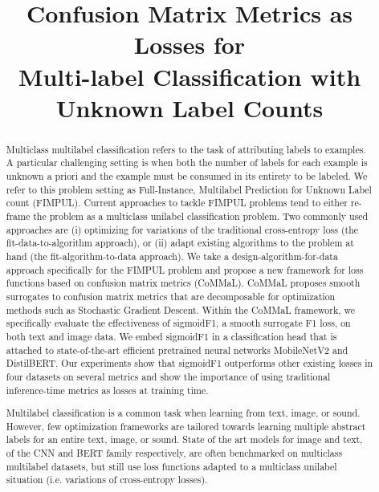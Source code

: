 \documentclass[sigconf,natbib,screen=true,review=true,anonymous]{acmart}
\begin{document}
\title[Confusion Matrix Metrics as Losses for Multi-label Classification]{Confusion Matrix Metrics as Losses for \\ Multi-label Classification with Unknown Label Counts}


\begin{abstract}

Multiclass multilabel classification refers to the task of attributing labels to examples. A particular challenging setting is when both the number of labels for each example is unknown a priori and the example must be consumed in its entirety to be labeled. We refer to this problem setting as Full-Instance, Multilabel Prediction for Unknown Label count (FIMPUL). Current approaches to tackle FIMPUL problems tend to either re-frame the problem as a multiclass unilabel classification problem. Two commonly used approaches are (i) optimizing for variations of the traditional cross-entropy loss (the fit-data-to-algorithm approach), or (ii) adapt existing algorithms to the problem at hand (the fit-algorithm-to-data approach). We take a design-algorithm-for-data approach specifically for the FIMPUL problem and propose a new framework for loss functions based on confusion matrix metrics (CoMMaL). CoMMaL proposes smooth surrogates to confusion matrix metrics that are decomposable for optimization methods such as Stochastic Gradient Descent. Within the CoMMaL framework, we specifically evaluate the effectiveness of sigmoidF1, a smooth surrogate F1 loss, on both text and image data. We embed sigmoidF1 in a classification head that is attached to state-of-the-art efficient pretrained neural networks MobileNetV2 and DistilBERT. Our experiments show that sigmoidF1 outperforms other existing losses in four datasets on several metrics and show the importance of using traditional inference-time metrics as losses at training time. 
  
Multilabel classification is a common task when learning from text, image, or sound. However, few optimization frameworks are tailored towards learning multiple abstract labels for an entire text, image, or sound. State of the art models for image and text, of the CNN and BERT family respectively, are often benchmarked on multiclass multilabel datasets, but still use loss functions adapted to a multiclass unilabel situation (i.e. variations of cross-entropy losses).


\end{abstract}
\end{document}
